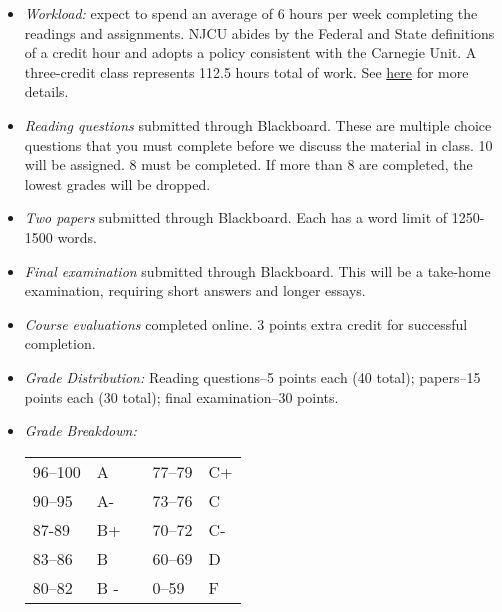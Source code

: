 \documentclass[article,oneside]{memoir}
\begin{document}
\begin{itemize}


\item \textit{Workload:} expect to spend an average of 6 hours per week completing the readings and assignments. NJCU abides by the Federal and State definitions of a credit hour and adopts a policy consistent with the Carnegie Unit. A three-credit class represents 112.5 hours total of work. See \href{http://scottoconnor.org/resources/Credit.pdf}{here} for more details.




\item \textit{Reading questions} submitted through Blackboard. These are multiple choice questions that you must complete before we discuss the material in class. 10 will be assigned. 8 must be completed. If more than 8 are completed, the lowest grades will be dropped. 



\item \textit{Two papers} submitted through Blackboard. Each has a word limit of 1250-1500 words. 

\item \textit{Final examination} submitted through Blackboard. This will be a take-home examination, requiring short answers and longer essays.  

\item \textit{Course evaluations} completed online. 3 points extra credit for successful completion.

\item \textit{Grade Distribution:} Reading questions--5 points each (40 total); papers--15 points each (30 total); final examination--30 points.



\item \textit{Grade Breakdown:}

 \begin{tabular}{ | l | l | p{2cm} | l | l | }
    \hline 
96--100 & A  & &  77--79 &  C+ \\  
90--95 & A- & &  73--76 & C \\
87-89 & B+ &  &  70--72 & C- \\ 
83--86 & B  & &  60--69 & D\\
80--82 & B - & & 0--59 & F\\ \hline
    \end{tabular}


\end{itemize}
\end{document}
